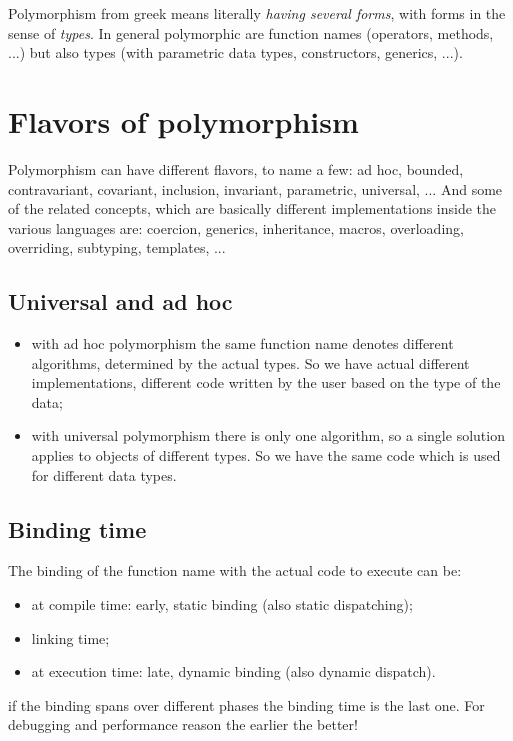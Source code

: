 Polymorphism from greek means literally \emph{having several forms}, with forms in the sense of \emph{types}.
In general polymorphic are function names (operators, methods, ...) but also types (with parametric data types, constructors, generics, ...).

\section{Flavors of polymorphism}
Polymorphism can have different flavors, to name a few: ad hoc, bounded, contravariant, covariant, inclusion, invariant, parametric, universal, ...
And some of the related concepts, which are basically different implementations inside the various languages are: coercion, generics, inheritance, macros, overloading, overriding, subtyping, templates, ...

\subsection{Universal and ad hoc}
\begin{itemize}
    \item with ad hoc polymorphism the same function name denotes different algorithms, determined by the actual types.
    So we have actual different implementations, different code written by the user based on the type of the data;
    
    \item with universal polymorphism there is only one algorithm, so a single solution applies to objects of different types.
    So we have the same code which is used for different data types.
\end{itemize}

\subsection{Binding time}
The binding of the function name with the actual code to execute can be:
\begin{itemize}
    \item at compile time: early, static binding (also static dispatching);
    \item linking time;
    \item at execution time: late, dynamic binding (also dynamic dispatch).
\end{itemize}
if the binding spans over different phases the binding time is the last one.
For debugging and performance reason the earlier the better!

